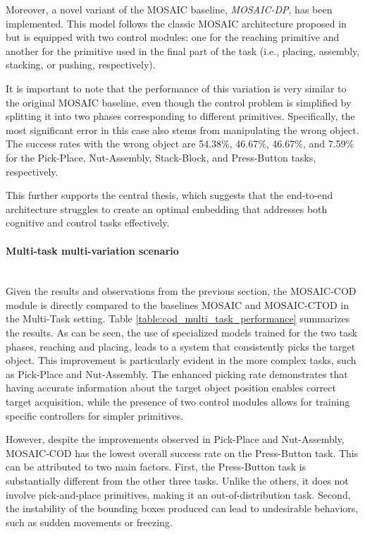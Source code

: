 Moreover, a novel variant of the MOSAIC baseline, \textit{MOSAIC-DP}, has been implemented. This model follows the classic MOSAIC architecture proposed in \cite{mandi2022towards_more_generalizable_one_shot} but is equipped with two control modules: one for the reaching primitive and another for the primitive used in the final part of the task (i.e., placing, assembly, stacking, or pushing, respectively). 

It is important to note that the performance of this variation is very similar to the original MOSAIC baseline, even though the control problem is simplified by splitting it into two phases corresponding to different primitives. Specifically, the most significant error in this case also stems from manipulating the wrong object. The success rates with the wrong object are 54.38\%, 46.67\%, 46.67\%, and 7.59\% for the Pick-Place, Nut-Assembly, Stack-Block, and Press-Button tasks, respectively. 

This further supports the central thesis, which suggests that the end-to-end architecture struggles to create an optimal embedding that addresses both cognitive and control tasks effectively.

\paragraph*{Multi-task multi-variation scenario}\mbox{}\\

Given the results and observations from the previous section, the MOSAIC-COD module is directly compared to the baselines MOSAIC and MOSAIC-CTOD in the Multi-Task setting. Table \ref{table:cod_multi_task_performance} summarizes the results. As can be seen, the use of specialized models trained for the two task phases, reaching and placing, leads to a system that consistently picks the target object. This improvement is particularly evident in the more complex tasks, such as Pick-Place and Nut-Assembly. The enhanced picking rate demonstrates that having accurate information about the target object position enables correct target acquisition, while the presence of two control modules allows for training specific controllers for simpler primitives.

However, despite the improvements observed in Pick-Place and Nut-Assembly, MOSAIC-COD has the lowest overall success rate on the Press-Button task. This can be attributed to two main factors. First, the Press-Button task is substantially different from the other three tasks. Unlike the others, it does not involve pick-and-place primitives, making it an out-of-distribution task. Second, the instability of the bounding boxes produced can lead to undesirable behaviors, such as sudden movements or freezing.

